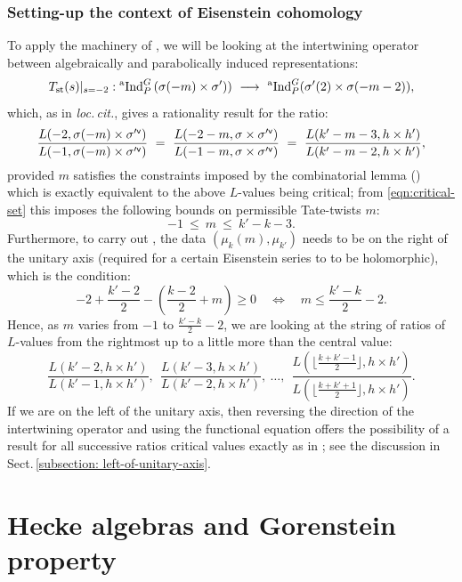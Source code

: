 \documentclass[11pt]{amsart}
\newcommand{\aInd}{{}^{\rm a}{\rm Ind}}
\begin{document}
\subsubsection{Setting-up the context of Eisenstein cohomology}
\label{sec:set-up-eis-coh}
To apply the machinery of \cite{harder-raghuram}, we will be looking at the intertwining operator 
between algebraically and parabolically induced representations:
$$
T_{\rm st}(s)|_{s = -2} : \aInd_P^G\left(\sigma(-m) \times \sigma')\right) \ \longrightarrow \ 
\aInd_P^G(\sigma'(2) \times \sigma(-m-2)), 
$$
which, as in {\it loc.\,cit.}, gives a rationality result for the ratio:
$$
\frac{L(-2, \sigma(-m) \times \sigma'^{\sf v})}{L(-1, \sigma(-m) \times \sigma'^{\sf v})} \ = \ 
\frac{L(-2-m, \sigma \times \sigma'^{\sf v})}{L(-1-m, \sigma \times \sigma'^{\sf v})} \ = \ 
\frac{L(k' -m -3, h \times h')}{L(k' -m -2, h \times h')},
$$
provided $m$ satisfies the constraints imposed by the combinatorial lemma (\cite[Lem.\,7.14]{harder-raghuram})
which is exactly equivalent to the above $L$-values being critical; from 
\eqref{eqn:critical-set} this imposes the following bounds on permissible Tate-twists $m$:
$$
-1 \ \leq \ m \ \leq \ k'-k-3.
$$
Furthermore, to carry out \cite{harder-raghuram}, the data $(\mu_k(m), \mu_{k'})$ needs to be on the right of the unitary axis 
(required for a certain Eisenstein series to to be holomorphic), which is the condition:
$$
-2 + \frac{k'-2}{2} - \left(\frac{k-2}{2} + m \right) \geq 0 \quad \iff \quad m \leq \frac{k'-k}{2} - 2.
$$
Hence, as $m$ varies from $-1$ to $\frac{k'-k}{2} - 2$, we are looking at the string of ratios of $L$-values from the rightmost up to a little more than the central value:
$$
\frac{L(k' -2, h \times h')}{L(k' -1, h \times h')}, \ \ 
\frac{L(k' -3, h \times h')}{L(k' -2, h \times h')}, \ \dots, \ \ 
\frac{L(\lfloor \frac{k+k' -1}{2} \rfloor, h \times h')}{L( \lfloor \frac{k+k' + 1}{2} \rfloor, h \times h')}. 
$$
If we are on the left of the unitary axis, then reversing the direction of the intertwining operator and using the functional equation 
offers the possibility of a result for all successive ratios critical values exactly as in \cite{harder-raghuram}; see the discussion in Sect.\,\ref{subsection: left-of-unitary-axis}. 



\medskip
\section{Hecke algebras and Gorenstein property}
\label{sec:Hecke-Gorenstein}
\end{document}
